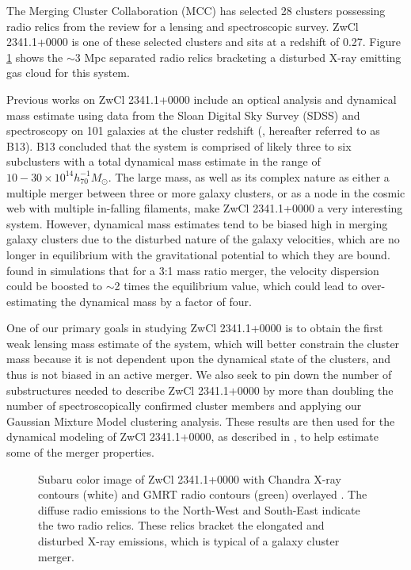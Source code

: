 \documentclass[onecolumn]{aastex}
\begin{document}
The Merging Cluster Collaboration (MCC) has selected 28 clusters possessing radio relics from the \cite{Feretti12} review for a lensing and spectroscopic survey.  ZwCl 2341.1+0000 is one of these selected clusters and sits at a redshift of 0.27.  Figure \ref{fig1} shows the $\sim$3 Mpc separated radio relics \citep{vanWeeren09} bracketing a disturbed X-ray emitting gas cloud \citep{Bagchi02} for this system.

Previous works on ZwCl 2341.1+0000 include an optical analysis and dynamical mass estimate using data from the Sloan Digital Sky Survey (SDSS) and spectroscopy on 101 galaxies at the cluster redshift (\cite{Boschin13}, hereafter referred to as B13).  B13 concluded that the system is comprised of likely three to six subclusters with a total dynamical mass estimate in the range of $10-30 \times10^{14} h^{-1}_{70} M_\odot$.  The large mass, as well as its complex nature as either a multiple merger between three or more galaxy clusters, or as a node in the cosmic web with multiple in-falling filaments, make ZwCl 2341.1+0000 a very interesting system.  However, dynamical mass estimates tend to be biased high in merging galaxy clusters due to the disturbed nature of the galaxy velocities, which are no longer in equilibrium with the gravitational potential to which they are bound.  \cite{Pinkney96} found in simulations that for a 3:1 mass ratio merger, the velocity dispersion could be boosted to $\sim$2 times the equilibrium value, which could lead to over-estimating the dynamical mass by a factor of four.

One of our primary goals in studying ZwCl 2341.1+0000 is to obtain the first weak lensing mass estimate of the system, which will better constrain the cluster mass because it is not dependent upon the dynamical state of the clusters, and thus is not biased in an active merger.  We also seek to pin down the number of substructures needed to describe ZwCl 2341.1+0000 by more than doubling the number of spectroscopically confirmed cluster members and applying our Gaussian Mixture Model clustering analysis.  These results are then used for the dynamical modeling of ZwCl 2341.1+0000, as described in \cite{Dawson13}, to help estimate some of the merger properties.

\begin{figure}
\caption{Subaru color image of ZwCl 2341.1+0000 with Chandra X-ray contours (white) and GMRT radio contours (green) overlayed \citep{vanWeeren09}.  The diffuse radio emissions to the North-West and South-East indicate the two radio relics.  These relics bracket the elongated and disturbed X-ray emissions, which is typical of a galaxy cluster merger.\label{fig1}}
\end{figure}
\end{document}
